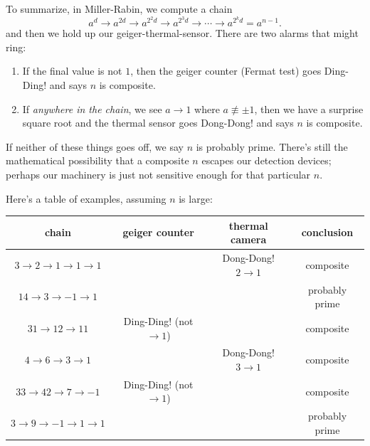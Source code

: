 \documentclass{article}
\theoremstyle{plain}
\theoremstyle{definition}
\theoremstyle{remark}
\numberwithin{theorem}{section}
\begin{document}
To summarize, in Miller-Rabin, we compute a chain 
\[
a^d \longrightarrow a^{2d} \longrightarrow a^{2^2d} \longrightarrow a^{2^3d} \longrightarrow \cdots \longrightarrow a^{2^k d} = a^{n-1}.
\]
and then we hold up our geiger-thermal-sensor.  There are two alarms that might ring:
\begin{enumerate}
    \item If the final value is not $1$, then the geiger counter (Fermat test) goes Ding-Ding! and says $n$ is composite.
    \item If \emph{anywhere in the chain}, we see $a \rightarrow 1$ where $a \not\equiv \pm 1$, then we have a surprise square root and the thermal sensor goes Dong-Dong! and says $n$ is composite.
\end{enumerate}
If neither of these things goes off, we say $n$ is probably prime.  There's still the mathematical possibility that a composite $n$ escapes our detection devices; perhaps our machinery is just not sensitive enough for that particular $n$.

Here's a table of examples, assuming $n$ is large:\\

\begin{tabular}{c|c|c|c}
chain & geiger counter & thermal camera & conclusion \\
\hline
$3 \rightarrow \boxed{2 \rightarrow 1} \rightarrow 1 \rightarrow 1$ &  & Dong-Dong! $2 \rightarrow 1$ & composite \\
$14 \rightarrow 3 \rightarrow -1 \rightarrow 1$ &  & & probably prime \\
$31 \rightarrow 12 \rightarrow \boxed{11}$ & Ding-Ding! (not $\rightarrow 1$) &  & composite \\
$4 \rightarrow 6 \rightarrow \boxed{3 \rightarrow 1}$ &  & Dong-Dong! $3 \rightarrow 1$ & composite \\    
$33 \rightarrow 42 \rightarrow 7 \rightarrow \boxed{-1}$ & Ding-Ding! (not $\rightarrow 1$) &  & composite \\
$3 \rightarrow 9 \rightarrow -1 \rightarrow 1 \rightarrow 1$ &  & & probably prime \\
\end{tabular}
\\
\end{document}
